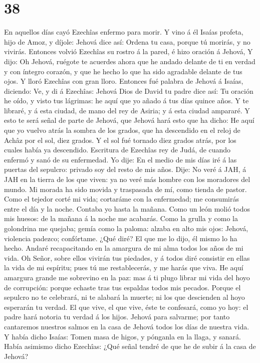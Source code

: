\hypertarget{section-37}{%
\section{38}\label{section-37}}

 En aquellos días cayó Ezechîas enfermo para morir. Y vino
á él Isaías profeta, hijo de Amoz, y díjole: Jehová dice así: Ordena tu
casa, porque tú morirás, y no vivirás.  Entonces volvió
Ezechîas su rostro á la pared, é hizo oración á Jehová,  Y
dijo: Oh Jehová, ruégote te acuerdes ahora que he andado delante de ti
en verdad y con íntegro corazón, y que he hecho lo que ha sido agradable
delante de tus ojos. Y lloró Ezechîas con gran lloro. 
Entonces fué palabra de Jehová á Isaías, diciendo:  Ve, y
di á Ezechîas: Jehová Dios de David tu padre dice así: Tu oración he
oído, y visto tus lágrimas: he aquí que yo añado á tus días quince años.
 Y te libraré, y á esta ciudad, de mano del rey de Asiria;
y á esta ciudad ampararé.  Y esto te será señal de parte
de Jehová, que Jehová hará esto que ha dicho:  He aquí que
yo vuelvo atrás la sombra de los grados, que ha descendido en el reloj
de Achâz por el sol, diez grados. Y el sol fué tornado diez grados
atrás, por los cuales había ya descendido.  Escritura de
Ezechîas rey de Judá, de cuando enfermó y sanó de su enfermedad.
 Yo dije: En el medio de mis días iré á las puertas del
sepulcro: privado soy del resto de mis años.  Dije: No
veré á JAH, á JAH en la tierra de los que viven: ya no veré más hombre
con los moradores del mundo.  Mi morada ha sido movida y
traspasada de mí, como tienda de pastor. Como el tejedor corté mi vida;
cortaráme con la enfermedad; me consumirás entre el día y la noche.
 Contaba yo hasta la mañana. Como un león molió todos mis
huesos: de la mañana á la noche me acabarás.  Como la
grulla y como la golondrina me quejaba; gemía como la paloma: alzaba en
alto mis ojos: Jehová, violencia padezco; confórtame. 
¿Qué diré? El que me lo dijo, él mismo lo ha hecho. Andaré recapacitando
en la amargura de mi alma todos los años de mi vida.  Oh
Señor, sobre ellos vivirán tus piedades, y á todos diré consistir en
ellas la vida de mi espíritu; pues tú me restablecerás, y me harás que
viva.  He aquí amargura grande me sobrevino en la paz:
mas á ti plugo librar mi vida del hoyo de corrupción: porque echaste
tras tus espaldas todos mis pecados.  Porque el sepulcro
no te celebrará, ni te alabará la muerte; ni los que descienden al hoyo
esperarán tu verdad.  El que vive, el que vive, éste te
confesará, como yo hoy: el padre hará notoria tu verdad á los hijos.
 Jehová para salvarme; por tanto cantaremos nuestros
salmos en la casa de Jehová todos los días de nuestra vida.
 Y había dicho Isaías: Tomen masa de higos, y pónganla en
la llaga, y sanará.  Había asimismo dicho Ezechîas: ¿Qué
señal tendré de que he de subir á la casa de Jehová?


